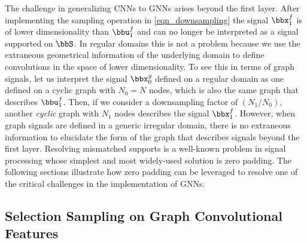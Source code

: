 The challenge in generalizing CNNs to GNNs arises beyond the first layer. After implementing the sampling operation in \eqref{eqn_downsampling} the signal $\bbx^{f}_{1}$ is of lower dimensionality than $\bbu_{1}^{f}$ and can no longer be interpreted as a signal supported on $\bbS$. In regular domains this is not a problem because we use the extraneous geometrical information of the underlying domain to define convolutions in the space of lower dimensionality. To see this in terms of graph signals, let us interpret the signal $\bbx_{0}^{g}$ defined on a regular domain as one defined on a cyclic graph with $N_0=N$ nodes, which is also the same graph that describes  $\bbu_{1}^{f}$. Then, if we consider a downsampling factor of $(N_{1}/N_{0})$,  another \textit{cyclic} graph with $N_1$ nodes describes the signal $\bbx_{1}^{f}$. However, when graph signals are defined in a generic irregular domain, there is no extraneous information to elucidate the form of the graph that describes signals beyond the first layer. Resolving mismatched supports is a well-known problem in signal processing whose simplest and most widely-used solution is zero padding. The following sections illustrate how zero padding can be leveraged to resolve one of the critical challenges in the implementation of GNNs.

%
\subsection{Selection Sampling on Graph Convolutional Features}\label{sec_selection_convolution}

